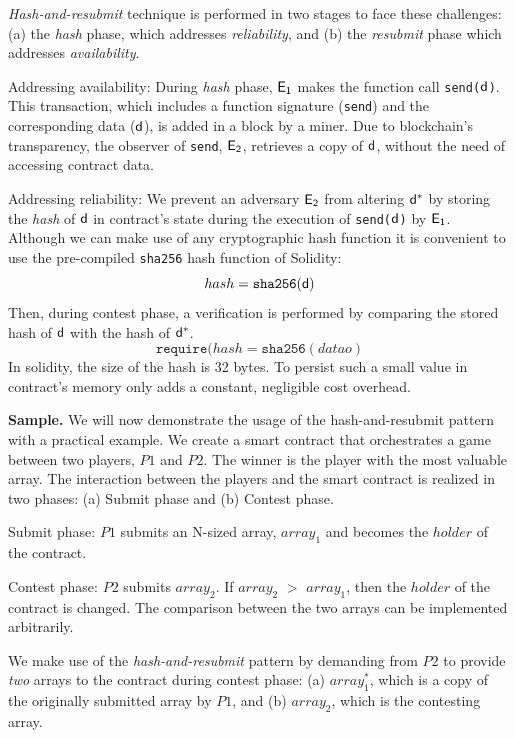 \noindent
\emph{Hash-and-resubmit} technique is performed in two
stages to face these challenges: (a) the \emph{hash} phase, which addresses
\emph{reliability}, and (b) the \emph{resubmit} phase which addresses
\emph{availability}.

\noindent \textsf{Addressing availability:} During \emph{hash} phase, $\mathsf{E_{1}}$
makes the function call \texttt{send($\mathsf{d}$)}. This transaction, which
includes a function signature (\texttt{send}) and the corresponding data
($\mathsf{d}$), is added in a block by a miner.  Due to blockchain's transparency,
the observer of \texttt{send}, $\mathsf{E_{2}}$, retrieves a copy of $\mathsf{d}$,
without the need of accessing contract data.

\noindent \textsf{Addressing reliability:} We prevent an adversary $\mathsf{E_{2}}$
from altering $\mathsf{d^*}$ by storing the \emph{hash} of $\mathsf{d}$ in contract's
state during the execution of \texttt{send($\mathsf{d}$)} by $\mathsf{E_{1}}$. Although we
can make use of any cryptographic hash function it is convenient to use the
pre-compiled \texttt{sha256} hash function of Solidity: \[hash =
\texttt{sha256}(\mathsf{d})\] Then, during contest phase, a verification is
performed by comparing the stored hash of $\mathsf{d}$ with the hash of $\mathsf{d^*}$.
\[\texttt{require}(hash = \texttt{sha256}(datao)\]
\noindent In solidity, the
size of the hash is 32 bytes. To persist such a small value in contract's
memory only adds a constant, negligible cost overhead.

\noindent \textbf{Sample.} We will now demonstrate the usage of the
hash-and-resubmit pattern with a practical example. We create a smart contract
that orchestrates a game between two players, $P1$ and $P2$. The winner is the
player with the most valuable array. The interaction between the players and
the smart contract is realized in two phases: (a) Submit phase and (b) Contest
phase.

\noindent \textsf{Submit phase:} $P1$ submits an N-sized array, $array_1$ and
becomes the $holder$ of the contract.

\noindent \textsf{Contest phase:} $P2$ submits $array_2$. If $array_2$ $>$
$array_1$, then the $holder$ of the contract is changed. The comparison between
the two arrays can be implemented arbitrarily.

We make use of the \emph{hash-and-resubmit} pattern by demanding from $P2$ to
provide \emph{two} arrays to the contract during contest phase: (a)
$array_1^*$, which is a copy of the originally submitted array by $P1$, and (b)
$array_2$, which is the contesting array.

